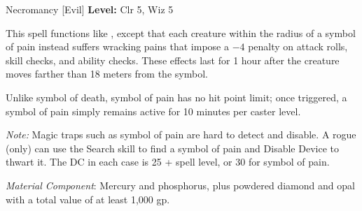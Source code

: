 {Necromancy [Evil]}
{
	\textbf{Level:}
	Clr 5, Wiz 5\\
}
{
	This spell functions like , except that each creature within the radius of a symbol of pain instead suffers wracking pains that impose a $-4$ penalty on attack rolls, skill checks, and ability checks. These effects last for 1 hour after the creature moves farther than 18 meters from the symbol.

	Unlike symbol of death, symbol of pain has no hit point limit; once triggered, a symbol of pain simply remains active for 10 minutes per caster level.

	\textit{Note:} Magic traps such as symbol of pain are hard to detect and disable. A rogue (only) can use the Search skill to find a symbol of pain and Disable Device to thwart it. The DC in each case is 25 + spell level, or 30 for symbol of pain.

	\textit{Material Component}:
	Mercury and phosphorus, plus powdered diamond and opal with a total value of at least 1,000 gp.

}
